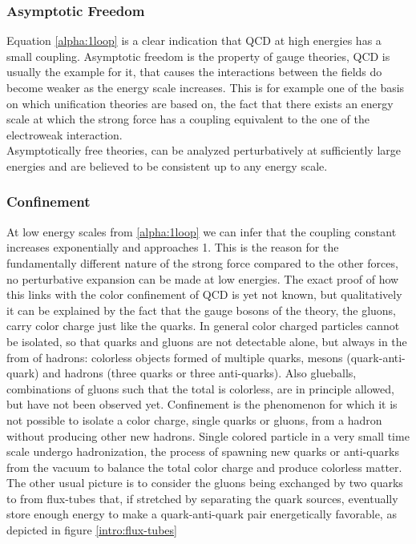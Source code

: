 \subsubsection{Asymptotic Freedom}
Equation \ref{alpha:1loop} is a clear indication that QCD at high energies has a small coupling. Asymptotic freedom is the property of gauge theories, QCD is usually the example for it, that causes the interactions between the fields do become weaker as the energy scale increases. This is for example one of the basis on which unification theories are based on, the fact that there exists an energy scale at which the strong force has a coupling equivalent to the one of the electroweak interaction.  \\
Asymptotically free theories, can be analyzed perturbatively at sufficiently large energies and are believed to be consistent up to any energy scale.

\subsubsection{Confinement}
At low energy scales from \ref{alpha:1loop} we can infer that the coupling constant increases exponentially and approaches 1. This is the reason for the fundamentally different nature of the strong force compared to the other forces, no perturbative expansion can be made at low energies. The exact proof of how this links with the color confinement of QCD is yet not known, but qualitatively it can be explained by the fact that the gauge bosons of the theory, the gluons, carry color charge just like the quarks.
In general color charged particles cannot be isolated, so that quarks and gluons are not detectable alone, but always in the from of hadrons: colorless objects formed of multiple quarks, mesons (quark-anti-quark) and hadrons (three quarks or three anti-quarks). Also glueballs, combinations of gluons such that the total is colorless, are in principle allowed, but have not been observed yet. Confinement is the phenomenon for which it is not possible to isolate a color charge, single quarks or gluons, from a hadron without producing other new hadrons. Single colored particle in a very small time scale undergo hadronization, the process of spawning new quarks or anti-quarks from the vacuum to balance the total color charge and produce colorless matter. \\
The other usual picture is to consider the gluons being exchanged by two quarks to from flux-tubes that, if stretched by separating the quark sources, eventually store enough energy to make a quark-anti-quark pair energetically favorable, as depicted in figure \ref{intro:flux-tubes}

